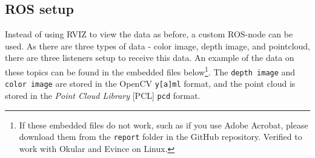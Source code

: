 \documentclass[11pt]{article}
\begin{document}
\subsection{ROS setup}
Instead of using RVIZ to view the data as before, a custom ROS-node can be used. As there are three types of data - color image, depth image, and pointcloud, there are three listeners setup to receive this data. An example of the data on these topics can be found in the embedded files below\footnote{If these embedded files do not work, such as if you use Adobe Acrobat, please download them from the \texttt{report} folder in the GitHub repository. Verified to work with Okular and Evince on Linux.}. The \texttt{depth image} and \texttt{color image} are stored in the OpenCV \texttt{y[a]ml} format, and the point cloud is stored in the \emph{Point Cloud Library} [PCL] \texttt{pcd} format.\par

\begin{center}
\end{center}
\end{document}
